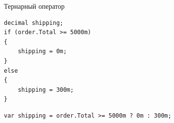 \documentclass[aspectratio=169,10pt,t]{beamer}
\begin{document}
\begin{frame}[fragile]{Тернарный оператор}
  \slidetop

  \begin{minipage}[t]{0.34\textwidth}
    \par\vspace{0.5em}
\begin{lstlisting}[style=csharp,basicstyle=\ttfamily\scriptsize]
decimal shipping;
if (order.Total >= 5000m)
{
    shipping = 0m;
}
else
{
    shipping = 300m;
}
\end{lstlisting}
  \end{minipage}\hfill
  \begin{minipage}[t]{0.61\textwidth}
    \par\vspace{0.5em}
\begin{lstlisting}[style=csharp,basicstyle=\ttfamily\scriptsize]
var shipping = order.Total >= 5000m ? 0m : 300m;
\end{lstlisting}
    \vspace{1.0em}
    \par
    \vspace{0.8em}
  \end{minipage}
\end{frame}
\end{document}
